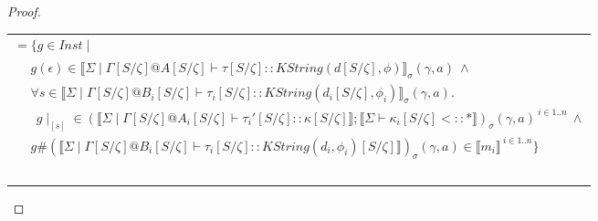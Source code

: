 \documentclass{article}
\newcommand{\sem}[1]{\llbracket #1 \rrbracket}
\begin{document}
\begin{proof}
\begin{description}
\begin{center}
\begin{tabular}{l}
$= \{ g \in \mathit{Inst} \mid$ \\
$~~~~~~g(\epsilon) \in \sem{\Sigma \mid \Gamma[S/\zeta] @ A[S/\zeta] \vdash \tau[S/\zeta] :: \mathit{KString(d[S/\zeta],\phi)}}_{\sigma}(\gamma,a)~\wedge$ \\
$~~~~~~\forall s \in \sem{\Sigma \mid \Gamma[S/\zeta] @ B_i[S/\zeta] \vdash \tau_i[S/\zeta] :: \mathit{KString}(d_i[S/\zeta],\phi_i)}_{\sigma}(\gamma,a).$\\
$~~~~~~~~g \! \mid_{[s]} \in (\sem{\Sigma \mid \Gamma[S/\zeta] @ A_i[S/\zeta] \vdash \tau_i'[S/\zeta] :: \kappa[S/\zeta]};\sem{\Sigma \vdash \kappa_i[S/\zeta] <:: \ast})_{\sigma}(\gamma,a)^{~i \in 1..n}~\wedge$\\
$~~~~~~g \# (\sem{\Sigma \mid \Gamma[S/\zeta] @ B_i[S/\zeta] \vdash \tau_i[S/\zeta] :: \mathit{KString}(d_i,\phi_i)[S/\zeta]})_\sigma(\gamma,a) \in \sem{m_i}^{~i \in 1..n} \}$\\~\\
 

\end{tabular}
\end{center}
\end{description}
\end{proof}
\end{document}
